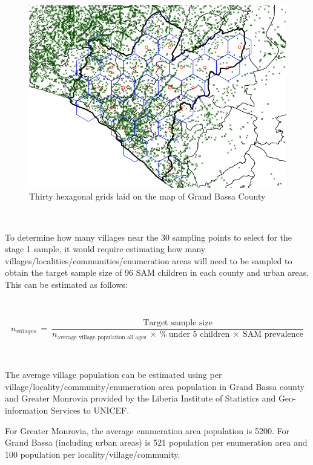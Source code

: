 \documentclass[12pt,a4paper]{book}
\theoremstyle{definition}
\theoremstyle{definition}
\theoremstyle{definition}
\theoremstyle{remark}
\begin{document}
\newpage

\begin{figure}[H]

{\centering \includegraphics{figures/sample23-1} 

}

\caption{Thirty hexagonal grids laid on the  map of Grand Bassa County}\label{fig:sample23}
\end{figure}

~

To determine how many villages near the 30 sampling points to select for
the stage 1 sample, it would require estimating how many
villages/localities/communities/enumeration areas will need to be
sampled to obtain the target sample size of 96 SAM children in each
county and urban areas. This can be estimated as follows:

~

\[ n_{villages} ~ = ~ \frac{\text{Target sample size}}{n_{\text{average village population all ages}} ~ \times ~ \% ~ \text{under 5 children} ~ \times ~ \text{SAM prevalence}} \]

~

The average village population can be estimated using per
village/locality/community/enumeration area population in Grand Bassa
county and Greater Monrovia provided by the Liberia Institute of
Statistics and Geo-information Services to UNICEF.

For Greater Monrovia, the average enumeration area population is 5200.
For Grand Bassa (including urban areas) is 521 population per
enumeration area and 100 population per locality/village/community.
\end{document}
